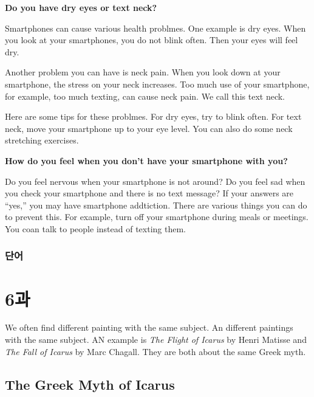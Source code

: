 \documentclass[9pt, a4paper]{oblivoir}
\begin{document}
    \noindent
    \textbf{Do you have dry eyes or text neck?}

    Smartphones can cause various health problmes. One example is dry eyes. 
    When you look at your smartphones, you do not blink often. Then your eyes will feel dry. 
    
    Another problem you can have is neck pain. When you look down at your smartphone, the stress on your neck increases.
    Too much use of your smartphone, for example, too much texting, can cause neck pain.
    We call this text neck.

    Here are some tips for these problmes. For dry eyes, try to blink often. For text neck, move your smartphone up to your eye level. You can also do some neck stretching exercises.\newline

    \noindent
    \textbf{How do you feel when you don't have your smartphone with you?}

    Do you feel nervous when your smartphone is not around? Do you feel sad when you check your smartphone and there is no text message? 
    If your answers are ``yes,'' you may have smartphone addtiction. There are various things you can do to prevent this. 
    For example, turn off your smartphone during meals or meetings. You coan talk to people instead of texting them. 
    
    \vspace*{9cm}
    \subsubsection*{단어}

    \newpage

    \section*{6과}

    We often find different painting with the same subject. An different paintings with the same subject.
    AN example is \emph{The Flight of Icarus} by Henri Matisse and \emph{The Fall of Icarus} by Marc Chagall. They are both about the same Greek myth.

    \subsection*{The Greek Myth of Icarus}
\end{document}
